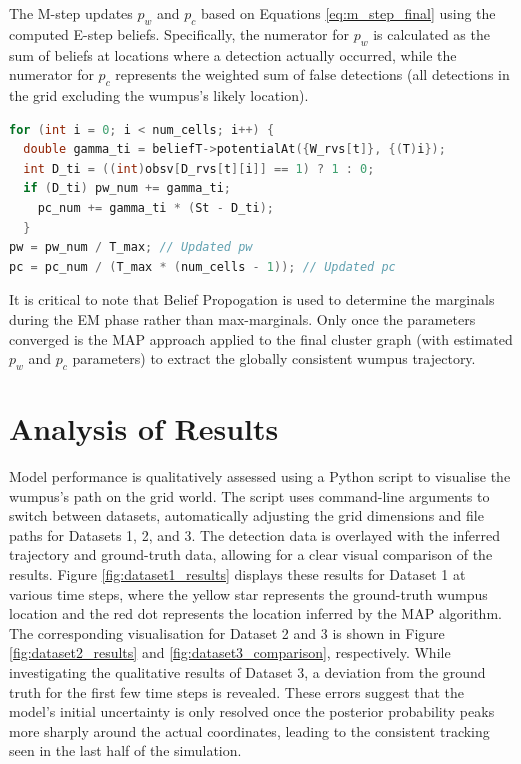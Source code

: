 \documentclass[10pt]{article}
\begin{document}
The M-step updates $p_w$ and $p_c$ based on Equations \ref{eq:m_step_final} using the computed E-step beliefs. 
Specifically, the numerator for $p_w$ is calculated as the sum of beliefs at locations where a detection actually occurred, while the numerator for $p_c$ represents the weighted sum of false detections (all detections in the grid excluding the wumpus's likely location). 
\begin{lstlisting}[language=C++, caption={M-step: Parameter update step.}, label={lst:mstep}]
for (int i = 0; i < num_cells; i++) {
  double gamma_ti = beliefT->potentialAt({W_rvs[t]}, {(T)i});
  int D_ti = ((int)obsv[D_rvs[t][i]] == 1) ? 1 : 0;
  if (D_ti) pw_num += gamma_ti; 
    pc_num += gamma_ti * (St - D_ti); 
  }
pw = pw_num / T_max; // Updated pw
pc = pc_num / (T_max * (num_cells - 1)); // Updated pc
\end{lstlisting}
It is critical to note that Belief Propogation is used to determine the marginals during the EM phase rather than max-marginals. 
Only once the parameters converged is the MAP approach applied to the final cluster graph (with estimated $p_w$ and $p_c$ parameters) to extract the globally consistent wumpus trajectory.

\section{Analysis of Results}
\label{sec:concl}
Model performance is qualitatively assessed using a Python script to visualise the wumpus's path on the grid world. 
The script uses command-line arguments to switch between datasets, automatically adjusting the grid dimensions and file paths for Datasets 1, 2, and 3.
The detection data is overlayed with the inferred trajectory and ground-truth data, allowing for a clear visual 
comparison of the results. Figure \ref{fig:dataset1_results} displays these results for Dataset 1 at various time steps, where the yellow star represents the ground-truth wumpus location and the red dot represents the location inferred by the MAP algorithm. 
The corresponding visualisation for Dataset 2 and 3 is shown in Figure \ref{fig:dataset2_results} and \ref{fig:dataset3_comparison}, respectively. 
While investigating the qualitative results of Dataset 3, a deviation from the ground truth for the first few time steps is revealed. 
These errors suggest that the model's initial uncertainty is only resolved once the posterior probability peaks more sharply around the actual coordinates, leading to the consistent tracking seen in the last half of the simulation.
\end{document}
